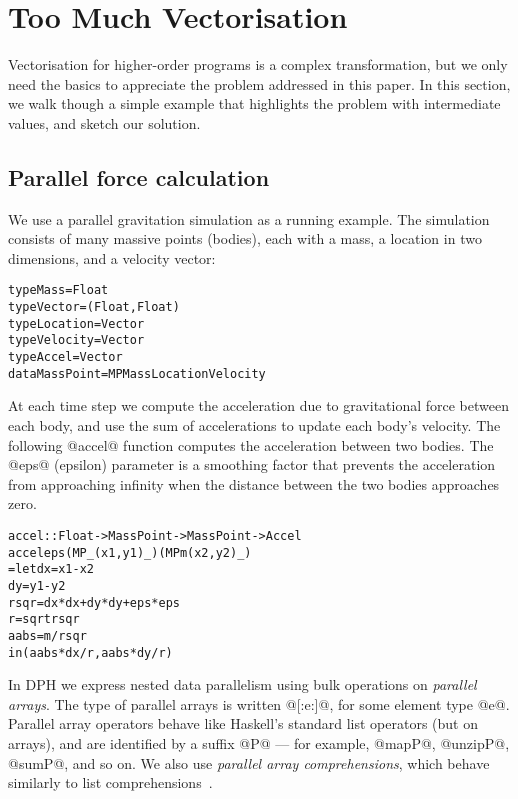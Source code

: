 \eject
\section{Too Much Vectorisation}
\label{Section:too-much}

Vectorisation for higher-order programs is a complex transformation, but we only need the basics to appreciate the problem addressed in this paper. In this section, we walk though a simple example that highlights the problem with intermediate values, and sketch our solution.

\subsection{Parallel force calculation}

We use a parallel gravitation simulation as a running example. The simulation consists of many massive points (bodies), each with a mass, a location in two dimensions, and a velocity vector: 
%
\begin{small}
\begin{alltt}
  type Mass      = Float
  type Vector    = (Float, Float)
  type Location  = Vector
  type Velocity  = Vector
  type Accel     = Vector
  data MassPoint = MP Mass Location Velocity
\end{alltt}
\end{small}
%
At each time step we compute the acceleration due to gravitational force between each body, and use the sum of accelerations to update each body's velocity. The following @accel@ function computes the acceleration between two bodies. The @eps@ (epsilon) parameter is a smoothing factor that prevents the acceleration from approaching infinity when the distance between the two bodies approaches zero.
%
\begin{small}
\begin{alltt}
  accel :: Float -> MassPoint -> MassPoint -> Accel                            
  accel eps (MP _ (x1, y1) _) (MP m (x2, y2) _)
   = let dx   = x1 - x2 
         dy   = y1 - y2 
         rsqr = dx * dx + dy * dy + eps * eps
         r    = sqrt rsqr 
         aabs = m  / rsqr
     in  (aabs * dx / r , aabs * dy / r)  
\end{alltt}
\end{small}
%
In DPH we express nested data parallelism using bulk operations on \emph{parallel arrays}. The type of parallel arrays is written @[:e:]@, for some element type @e@. Parallel array operators behave like Haskell's standard list operators (but on arrays), and are identified by a suffix @P@ --- for example, @mapP@, @unzipP@, @sumP@, and so on.  We also use \emph{parallel array comprehensions}, which behave similarly to list comprehensions~\cite{Jones08harnessingthe}.

